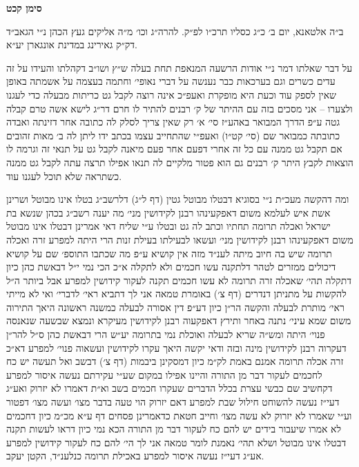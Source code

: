 \documentclass[12pt, openany]{book}
\newcommand{\chapname}{}
\newcommand{\newchap}[1]{
	\addcontentsline{toc}{chapter}{#1}
	\renewcommand{\chapname}{#1}
		\begin{center}
			\textbf{%
\fontsize{16pt}{16pt}\selectfont
				#1}
		\end{center}
}
\begin{document}
\newchap{סימן קכט}
\begin{multicols}{2}
ב״ה אלטאנא, יום ב׳ כ״ג כסליו תרכ״ו לפ״ק. להרה״ג וכו׳ מ״ה אליקים געץ הכהן נ״י הגאב״ד דק״ק גאירינג במדינת אונגארן יע״א.\\\vspace{0pt}

על דבר שאלתו דמר נ״י אודות הרשעה המנאפת תחת בעלה ש״ץ ושו״ב דקהלתו והעידו על זה עדים כשרים וגם בערכאות כבר נענשה על דברי נאופי׳ וחתמה בעצמה על אשמתה באופן שאין לספק עוד וכעת היא מופקרת ואעפ״כ אינה רוצה לקבל גט כריתות מבעלה כדי לעגנו ולצערו – אני מסכים בזה עם ההיתר של ק׳ רבנים להתיר לו חרם דר״ג לישא אשה טרם קבלה גטה ע״פ הדרך המבואר באהע״ז סי׳ א׳ רק שאין צריך לסלק לה כתובה אחר דזינתה ואבדה כתובתה כמבואר שם (סי׳ קט״ו) ואעפ״י שהתחייב עצמו בכתב ידו ליתן לה ב׳ מאות זהובים אם תקבל גט ממנה עם כל זה אחרי דפעם אחר פעם מיאנה לקבל גט על תנאי זה וגרמה לו הוצאות לקבץ היתר ק׳ רבנים גם הוא פטור מלקיים לה תנאו אפילו תרצה עתה לקבל גט ממנה כשתראה שלא תוכל לעגנו עוד.\\\vspace{0pt}

ומה דהקשה מעכ״ת נ״י בסוגיא דבטלו מבוטל גטין (דף ל״ג) דלרשב״ג בטלו אינו מבוטל ושרינן אשת איש לעלמא משום דאפקעינהו רבנן לקידושין מני׳ מה יענה רשב״ג בכהן שנשא בת ישראל ואכלה תרומה תחתיו וכתב לה גט ובטלו ע״י שליח דאי אמרינן דבטלו אינו מבוטל משום דאפקעינהו רבנן לקידושין מני׳ ועשאו לבעילתו בעילת זנות הרי היתה למפרע זרה ואכלה תרומה שיש בה חיוב מיתה לענ״ד מזה אין קושיא ע״פ מה שכתבו התוספ׳ שם על קושיא דיכולים ממזרים לטהר דלתקנה עשו חכמים ולא לתקלה א״כ הכי נמי י״ל דבאשת כהן כיון דתקלה תהי׳ שאכלה זרה תרומה לא עשו חכמים תקנה לעקור קידושין למפרע אבל ביותר ה״ל להקשות על מתניתן דנדרים (דף צ׳) באומרת טמאה אני לך דתביא ראי׳ לדברי׳ ואי לא מייתי ראי׳ מותרת לבעלה והקשה הר״ן כיון דע״פ דין אסורה לבעלה כמשנה ראשונה היאך התירוה משום שמא עיני׳ נתנה באחר ותירץ דאפקעוה רבנן לקידושין מעיקרא ונמצא שבשעה שנאנסה פנוי׳ היתה ומש״ה שריא לבעלה ואוכלת נמי בתרומה יע״ש הרי דבאשת כהן ס״ל להר״ן דעקרוה רבנן לקידושין מינה ובזה ודאי יקשה היאך עקרו לקידושין ועשאוה פנוי׳ למפרע דא״כ זרה אכלה תרומה אמנם באמת לק״מ כיון דמסקינן ביבמות (דף צ׳) דבשב ואל תעשה יש כח לחכמים לעקור דבר מן התורה והיינו אפילו במקום שע״י עקירתם נעשה איסור למפרע דקחשיב שם כבשי עצרת בכלל הדברים שעקרו חכמים בשב וא״ת דאמרו לא יזרוק ואע״ג דעי״ז נעשה להשוחט חילול שבת למפרע דאם יזרוק הוי טעה בדבר מצו׳ ועשה מצו׳ דפטור וע״י שאמרו לא יזרוק לא עשה מצו׳ וחייב חטאת כדאמרינן פסחים דף ע״א מכ״מ כיון דחכמים לא אמרו שיעבור בידים יש להם כח לעקור דבר מן התורה הכא נמי כיון דראו לעשות תקנה דבטלו אינו מבוטל ושלא תהי׳ נאמנת לומר טמאה אני לך הי׳ להם כח לעקור קידושין למפרע אע״ג דעי״ז נעשה איסור למפרע באכילת תרומה כנלענ״ד, הקטן יעקב.\\\vspace{0pt}

\end{multicols}\newpage
\end{document}
